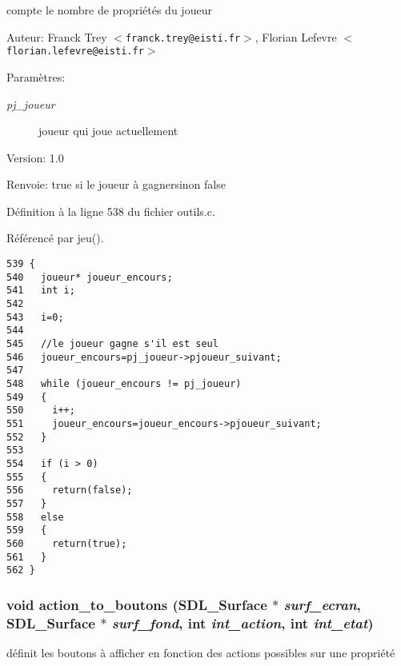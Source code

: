 compte le nombre de propri\'{e}t\'{e}s du joueur 

\begin{Desc}
\item[Auteur:]Franck Trey $<${\tt franck.trey@eisti.fr}$>$, Florian Lefevre $<${\tt florian.lefevre@eisti.fr}$>$\end{Desc}
\begin{Desc}
\item[Param\`{e}tres:]
\begin{description}
\item[{\em pj\_\-joueur}]joueur qui joue actuellement\end{description}
\end{Desc}
\begin{Desc}
\item[Version:]1.0 \end{Desc}
\begin{Desc}
\item[Renvoie:]true si le joueur \`{a} gagnersinon false \end{Desc}


D\'{e}finition \`{a} la ligne 538 du fichier outils.c.

R\'{e}f\'{e}renc\'{e} par jeu().

\begin{Code}\begin{verbatim}539 {
540   joueur* joueur_encours;
541   int i;
542   
543   i=0;
544   
545   //le joueur gagne s'il est seul
546   joueur_encours=pj_joueur->pjoueur_suivant;
547   
548   while (joueur_encours != pj_joueur)
549   {
550     i++;
551     joueur_encours=joueur_encours->pjoueur_suivant;
552   }
553   
554   if (i > 0)
555   {
556     return(false);
557   }
558   else 
559   {
560     return(true);
561   }
562 }
\end{verbatim}\end{Code}


\subsubsection{\setlength{\rightskip}{0pt plus 5cm}void action\_\-to\_\-boutons (SDL\_\-Surface $\ast$ {\em surf\_\-ecran}, SDL\_\-Surface $\ast$ {\em surf\_\-fond}, int {\em int\_\-action}, int {\em int\_\-etat})}\label{outils_8c_a5265e7645b52f6efcbfd18323082a1c}


d\'{e}finit les boutons \`{a} afficher en fonction des actions possibles sur une propri\'{e}t\'{e} 

